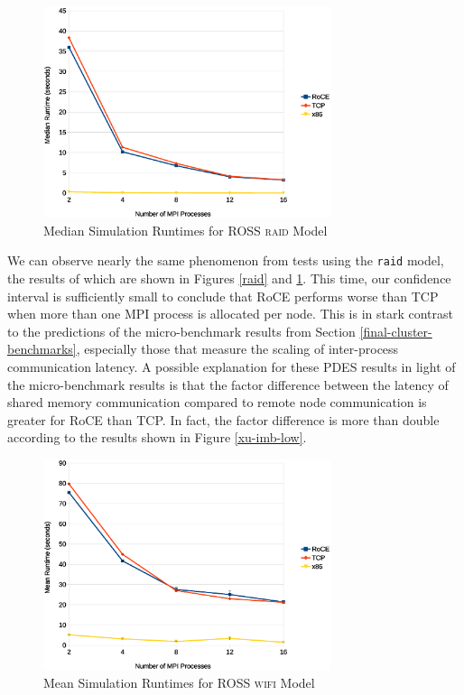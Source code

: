 \documentclass[11pt]{book}
\begin{document}
\begin{figure}
\centering
\includegraphics[width=0.75\textwidth]{raid_median}
\caption{Median Simulation Runtimes for ROSS \textsc{raid} Model}
\label{raid-median}
\end{figure}

We can observe nearly the same phenomenon from tests using the \verb;raid; model, the
results of which are shown in Figures \ref{raid} and \ref{raid-median}.  This time, our
confidence interval is sufficiently small to conclude that RoCE performs worse than TCP
when more than one MPI process is allocated per node.  This is in stark contrast to the
predictions of the micro-benchmark results from Section \ref{final-cluster-benchmarks},
especially those that measure the scaling of inter-process communication latency.  A
possible explanation for these PDES results in light of the micro-benchmark results is
that the factor difference between the latency of shared memory communication compared to
remote node communication is greater for RoCE than TCP.  In fact, the factor difference is
more than double according to the results shown in Figure \ref{xu-imb-low}.

\begin{figure}
\centering
\includegraphics[width=0.75\textwidth]{wifi}
\caption{Mean Simulation Runtimes for ROSS \textsc{wifi} Model}
\label{wifi}
\end{figure}
\end{document}
